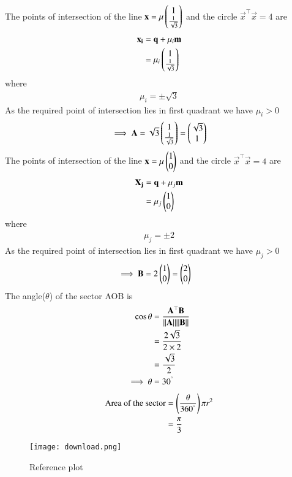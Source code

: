 \documentclass[journal,12pt,twocolumn]{IEEEtran}
\begin{document}
The points of intersection of the line $\mathbf{x}=\mu \begin{pmatrix}1 \\ \frac{1}{\sqrt{3}}\end{pmatrix}$ and the circle $\vec{x}^\top\vec{x}=4$ are 
\begin{align}
    \mathbf{x_i}&=\mathbf{q}+\mu_i\mathbf{m}\\
             &=\mu_i\begin{pmatrix}1\\ \frac{1}{\sqrt{3}}\end{pmatrix}
\end{align}
where 
\begin{align}
    \mu_i = \pm\sqrt{3}
\end{align}
As the required point of intersection lies in first quadrant we have $\mu_i>0$
\begin{align}
    \implies \mathbf{A}=\sqrt{3}\begin{pmatrix}1\\ \frac{1}{\sqrt{3}}\end{pmatrix}=\begin{pmatrix}\sqrt{3}\\1\end{pmatrix}
\end{align}
The points of intersection of the line $\mathbf{x}=\mu\begin{pmatrix}1\\0\end{pmatrix}$ and the circle $\vec{x}^\top\vec{x}=4$ are 
\begin{align}
    \mathbf{X_j}&=\mathbf{q}+\mu_j\mathbf{m}\\
             &=\mu_j\begin{pmatrix}1\\0\end{pmatrix}
\end{align}
where
\begin{align}
    \mu_j = \pm 2
\end{align}
As the required point of intersection lies in first quadrant we have $\mu_j>0$
\begin{align}
    \implies \mathbf{B}&=2\begin{pmatrix}1\\0\end{pmatrix}=\begin{pmatrix}2\\0\end{pmatrix}
\end{align}
The angle($\theta$) of the sector AOB is 
\begin{align}
    \cos{\theta}&=\frac{\mathbf{A}^{\top}\mathbf{B}}{\lVert\mathbf{A}\rVert\lVert\mathbf{B}\rVert}\\
    &=\frac{2\sqrt{3}}{2\times 2}\\
    &=\frac{\sqrt{3}}{2}\\
    \implies \theta &= 30^{\degree}
\end{align}
\begin{align}
    \text{Area of the sector}&=\left(\frac{\theta}{360^{\degree}}\right)\pi r^2\\
    &= \frac{\pi}{3}
\end{align}

\begin{figure}[!h]
 \centering
 \texttt{[image: download.png]}
 \caption{Reference plot}
 \label{plot}
\end{figure}
\end{document}
